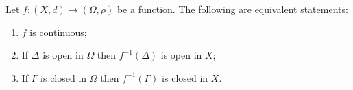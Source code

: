 Let $f: (X, d) \to (\Omega, \rho)$ be a function. The following are equivalent statements:

\begin{enumerate}
    \item[(a)] $f$ is continuous;
    \item[(b)] If $\Delta$ is open in $\Omega$ then $f^{-1}(\Delta)$ is open in $X$;
    \item[(c)] If $\Gamma$ is closed in $\Omega$ then $f^{-1}(\Gamma)$ is closed in $X$.
\end{enumerate}
